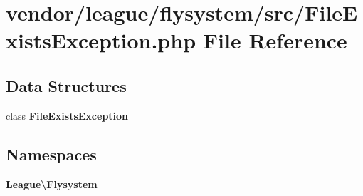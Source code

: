 \section{vendor/league/flysystem/src/\+File\+Exists\+Exception.php File Reference}
\label{_file_exists_exception_8php}
\subsection*{Data Structures}
\begin{DoxyCompactItemize}
\item 
class {\bf File\+Exists\+Exception}
\end{DoxyCompactItemize}
\subsection*{Namespaces}
\begin{DoxyCompactItemize}
\item 
 {\bf League\textbackslash{}\+Flysystem}
\end{DoxyCompactItemize}
